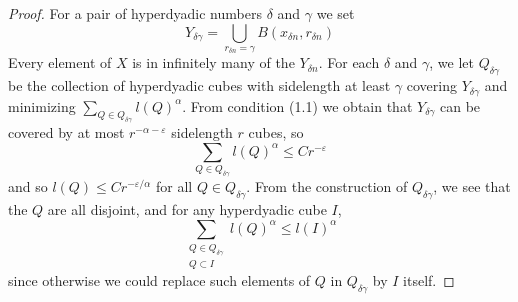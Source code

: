 \begin{proof}
    For a pair of hyperdyadic numbers $\delta$ and $\gamma$ we set
    \[ Y_{\delta \gamma} = \bigcup_{r_{\delta n} = \gamma} B(x_{\delta n}, r_{\delta n}) \]
    Every element of $X$ is in infinitely many of the $Y_{\delta n}$. For each $\delta$ and $\gamma$, we let $Q_{\delta \gamma}$ be the collection of hyperdyadic cubes with sidelength at least $\gamma$ covering $Y_{\delta \gamma}$ and minimizing $\sum_{Q \in Q_{\delta \gamma}} l(Q)^\alpha$. From condition (1.1) we obtain that $Y_{\delta \gamma}$ can be covered by at most $r^{-\alpha - \varepsilon}$ sidelength $r$ cubes, so
    \[ \sum_{Q \in Q_{\delta \gamma}} l(Q)^\alpha \leq Cr^{-\varepsilon} \]
    and so $l(Q) \leq Cr^{-\varepsilon/\alpha}$ for all $Q \in Q_{\delta \gamma}$. From the construction of $Q_{\delta \gamma}$, we see that the $Q$ are all disjoint, and for any hyperdyadic cube $I$,
    \[ \sum_{\substack{Q \in Q_{\delta \gamma}\\Q \subset I}} l(Q)^\alpha \leq l(I)^\alpha \]
    since otherwise we could replace such elements of $Q$ in $Q_{\delta \gamma}$ by $I$ itself.
\end{proof}

\endinput
